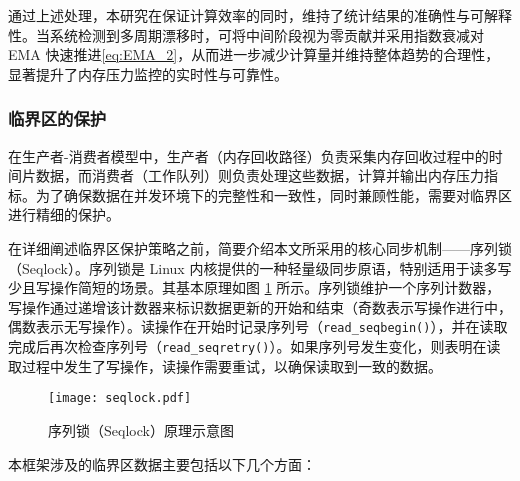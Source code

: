 
通过上述处理，本研究在保证计算效率的同时，维持了统计结果的准确性与可解释性。当系统检测到多周期漂移时，可将中间阶段视为零贡献并采用指数衰减对 EMA 快速推进\ref{eq:EMA_2}，从而进一步减少计算量并维持整体趋势的合理性，显著提升了内存压力监控的实时性与可靠性。


\subsubsection{临界区的保护}

在生产者-消费者模型中，生产者（内存回收路径）负责采集内存回收过程中的时间片数据，而消费者（工作队列）则负责处理这些数据，计算并输出内存压力指标。为了确保数据在并发环境下的完整性和一致性，同时兼顾性能，需要对临界区进行精细的保护。

在详细阐述临界区保护策略之前，简要介绍本文所采用的核心同步机制——序列锁（Seqlock）。序列锁是 Linux 内核提供的一种轻量级同步原语，特别适用于读多写少且写操作简短的场景。其基本原理如图 \ref{fig:seqlock} 所示。序列锁维护一个序列计数器，写操作通过递增该计数器来标识数据更新的开始和结束（奇数表示写操作进行中，偶数表示无写操作）。读操作在开始时记录序列号（\texttt{read\_seqbegin()}），并在读取完成后再次检查序列号（\texttt{read\_seqretry()}）。如果序列号发生变化，则表明在读取过程中发生了写操作，读操作需要重试，以确保读取到一致的数据。

\begin{figure}[H]
    \centering
    \texttt{[image: seqlock.pdf]}
    \caption{序列锁（Seqlock）原理示意图}
    \label{fig:seqlock}
\end{figure}

本框架涉及的临界区数据主要包括以下几个方面：

